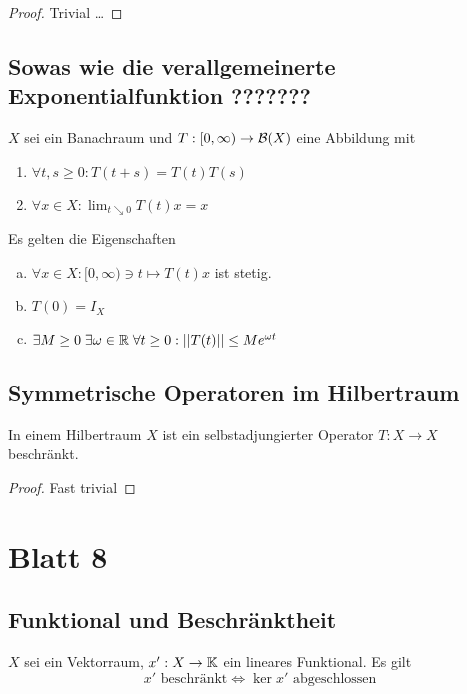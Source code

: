 \documentclass[FunkAnaskriptSS2017.tex]{subfiles}
\begin{document}
	\begin{proof}
	Trivial \dots
	\end{proof}


\subsection{ Sowas wie die verallgemeinerte Exponentialfunktion ???????}
\label{B7.4}
	$X$ sei ein Banachraum und $T:[0,\infty ) \to \mathcal{B}(X)$ eine Abbildung mit
	\begin{enumerate}
		\item $\forall t,s \geq 0 : T(t+s) = T(t)T(s)$
		\item $\forall x\in X : \lim_{t\searrow 0} T(t)x = x$
	\end{enumerate}
	Es gelten die Eigenschaften
	\begin{enumerate}[(a)]
		\item $\forall x \in X :[0,\infty) \ni t \mapsto T(t)x$ ist stetig.
		\item $T(0) = I_X$
		\item $\exists M \geq 0 \; \exists \omega \in \mathbb{R} \; \forall t \geq 0 : \left\lvert \left\lvert T(t) \right\rvert \right\rvert \leq M e^{\omega t}$
	\end{enumerate}


\subsection{ Symmetrische Operatoren im Hilbertraum }
\label{B7.5}
	In einem Hilbertraum $X$ ist ein selbstadjungierter Operator $T : X\to X$ beschränkt.
	
	\begin{proof}
	Fast trivial
	\end{proof}		
	
	
	
\newpage
\section{ Blatt 8}


\subsection{ Funktional und Beschränktheit}
\label{B8.1}
	$X$ sei ein Vektorraum, $x' : X\to \mathbb{K}$ ein lineares Funktional. Es gilt
	$$x' \text{ beschränkt} \Leftrightarrow \ker x' \text{ abgeschlossen}$$
\end{document}
